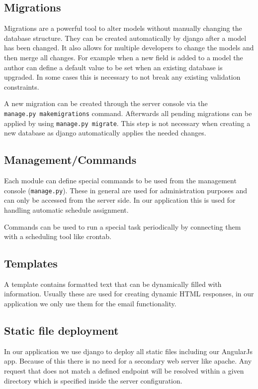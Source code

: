 \subsection{Migrations}\label{migrations}

Migrations are a powerful tool to alter models without manually changing
the database structure. They can be created automatically by django
after a model has been changed. It also allows for multiple developers
to change the models and then merge all changes. For example when a new
field is added to a model the author can define a default value to be
set when an existing database is upgraded. In some cases this is
necessary to not break any existing validation constraints.

A new migration can be created through the server console via the
\texttt{manage.py\ makemigrations} command. Afterwards all pending
migrations can be applied by using \texttt{manage.py\ migrate}. This
step is not necessary when creating a new database as django
automatically applies the needed changes.

\subsection{Management/Commands}\label{managementcommands}

Each module can define special commands to be used from the management
console (\texttt{manage.py}). These in general are used for
administration purposes and can only be accessed from the server side.
In our application this is used for handling automatic schedule
assignment.

Commands can be used to run a special task periodically by connecting
them with a scheduling tool like crontab.

\subsection{Templates}\label{templates}

A template contains formatted text that can be dynamically filled with
information. Usually these are used for creating dynamic HTML responses,
in our application we only use them for the email functionality.

\subsection{Static file deployment}\label{static-file-deployment}

In our application we use django to deploy all static files including
our AngularJs app. Because of this there is no need for a secondary web
server like apache. Any request that does not match a defined endpoint
will be resolved within a given directory which is specified inside the
server configuration.

